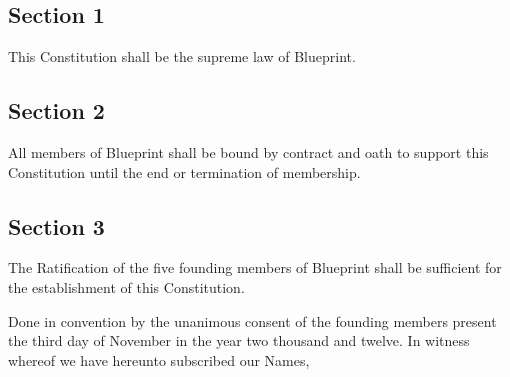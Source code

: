 \documentclass{article}
\begin{document}
\subsection{Section 1}
This Constitution shall be the supreme law of Blueprint.

\subsection{Section 2}
All members of Blueprint shall be bound by contract and oath to support this Constitution until the end or termination of membership.

\subsection{Section 3}
The Ratification of the five founding members of Blueprint shall be sufficient for the establishment of this Constitution.

Done in convention by the unanimous consent of the founding members present the third day of November in the year two thousand and twelve. In witness whereof we have hereunto subscribed our Names,
\\
\end{document}
